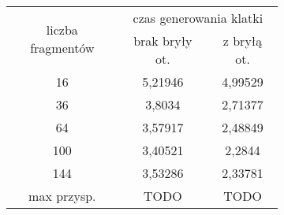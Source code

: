 \begin{figure}[!htb]
\advance\leftskip-2cm
	\begin{subfigure}{.5\textwidth}
	\end{subfigure}
	\hspace{2cm}
	\begin{subfigure}{.5\textwidth}
	\begin{longtable}{|c|c|c|} \hline
	    \multirow{2}{*}{liczba fragmentów} & \multicolumn{2}{|c|}{czas generowania klatki} \\ \cline{2-3}
	    & brak bryły ot. & z bryłą ot. \\ \hline
	    16 & 5,21946 & 4,99529 \\ 
	    36 & 3,8034 & 2,71377 \\
		64 & 3,57917 & 2,48849 \\
		100 & 3,40521 & 2,2844 \\
		144 & 3,53286 & 2,33781 \\ \hline
		max przysp. & TODO & TODO \\ \hline
	\end{longtable}
\end{subfigure}
\end{figure}
\pagebreak
